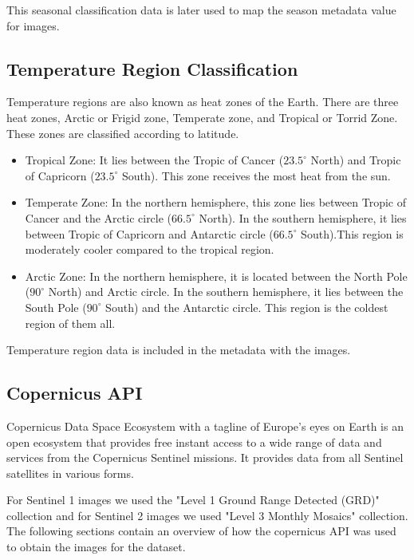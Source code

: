 This seasonal classification data is later used to map the season metadata value for images.

\subsection{Temperature Region Classification}

Temperature regions are also known as heat zones of the Earth. There are three heat zones, Arctic or Frigid zone, Temperate zone, and Tropical or Torrid Zone. These zones are classified according to latitude.

\begin{itemize}
    \item Tropical Zone: It lies between the Tropic of Cancer ($23.5^\circ$ North) and Tropic of Capricorn ($23.5^\circ$ South). This zone receives the most heat from the sun.
    \item Temperate Zone: In the northern hemisphere, this zone lies between Tropic of Cancer and the Arctic circle ($66.5^\circ$ North). In the southern hemisphere, it lies between Tropic of Capricorn and Antarctic circle ($66.5^\circ$ South).This region is moderately cooler compared to the tropical region.
    \item Arctic Zone: In the northern hemisphere, it is located between the North Pole ($90^\circ$ North) and Arctic circle. In the southern hemisphere, it lies between the South Pole ($90^\circ$ South) and the Antarctic circle. This region is the coldest region of them all.
\end{itemize}

Temperature region data is included in the metadata with the images.

\subsection{Copernicus API}

Copernicus Data Space Ecosystem with a tagline of Europe's eyes on Earth is an open ecosystem that provides free instant access to a wide range of data and services from the Copernicus Sentinel missions\cite{copernicusHome}. It provides data from all Sentinel satellites in various forms.

For Sentinel 1 images we used the "Level 1 Ground Range Detected (GRD)" collection and for Sentinel 2 images we used "Level 3 Monthly Mosaics" collection. The following sections contain an overview of how the copernicus API was used to obtain the images for the dataset.


